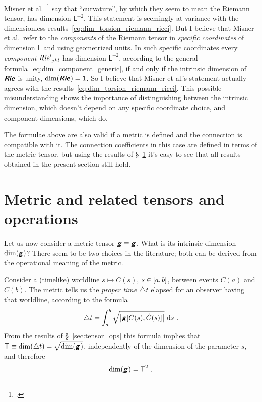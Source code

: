 \documentclass[\ifafour a4paper,12pt,\else a5paper,10pt,\fi%
onecolumn,oneside,article,%
british%
]{memoir}
\makeatletter
\theoremstyle{remark}
\theoremstyle{innote}
\newcommand*{\mathte}[1]{\textbf{\textit{\textsf{#1}}}}
\newcommand*{\citep}{\footcites}
\newcommand*{\di}{\mathrm{d}}%
\newcommand*{\incr}{\triangle}%
\DeclarePairedDelimiter\clcl{[}{]}
\DeclarePairedDelimiter\abs{\lvert}{\rvert}
\renewcommand*{\|}[1][]{\nonscript\,#1\vert\nonscript\;\mathopen{}}
\newcommand*{\sect}{\S}%
\newcommand*{\etal}{{et al.}}
\newcommand*{\q}{}%
\DeclareRobustCommand*{\q}{%
  \mathord{\mathpalette\bigcdot@{}}%
}
\newcommand*{\bigcdot@scalefactor}{0.7}
\newcommand*{\bigcdot@widthfactor}{1.5}
\newcommand*{\bigcdot@}[2]{%
  \sbox0{$#1\vcenter{}$}%
  \sbox2{$#1\cdot\m@th$}%
  \hbox to \bigcdot@widthfactor\wd2{%
    \hfil
    \raise\ht0\hbox{%
      \scalebox{\bigcdot@scalefactor}{%
        \lower\ht0\hbox{$#1\bullet\m@th$}%
      }%
    }%
    \hfil
  }%
}
\newcommand*{\Un}{\textsf{1}}
\newcommand*{\Le}{\textsf{L}}
\newcommand*{\Ti}{\textsf{T}}
\newcommand*{\yg}{\mathte{g}}
\newcommand*{\yR}{\mathte{Rie}}
\renewcommand*{\i}{\indices}
\newcommand*{\inct}{\incr t}
\makeatother
\begin{document}
Misner \etal\ \citep[p.~35%
]{misneretal1970_r1973} say that \enquote{curvature}, by which they seem to
mean the Riemann tensor, has dimension $\Le^{-2}$. This statement is
seemingly at variance with the dimensionless
results~\eqref{eq:dim_torsion_riemann_ricci}. But I believe that Misner
\etal\ refer to the \emph{components} of the Riemann tensor in
\emph{specific coordinates} of dimension $\Le$ and using geometrized units.
In such specific coordinates every \emph{component}
$\mathit{Rie}\i{^{i}_{jkl}}$ has dimension $\Le^{-2}$, according to the
general formula~\eqref{eq:dim_component_generic}, if and only if the
intrinsic dimension of $\yR$ is unity, $\dim(\yR)=\Un$. So I believe that
Misner \etal's statement actually agrees with the
results~\eqref{eq:dim_torsion_riemann_ricci}. This possible
misunderstanding shows the importance of distinguishing between the
intrinsic dimension, which doesn't depend on any specific coordinate
choice, and component dimensions, which do.

\medskip

The formulae above are also valid if a metric is defined and the connection
is compatible with it. The connection coefficients in this case are defined
in terms of the metric tensor, but using the results of
\sect~\ref{sec:metric} it's easy to see that all results obtained in the
present section still hold.


\section{Metric and related tensors and operations}
\label{sec:metric}

Let us now consider a metric tensor $\yg \equiv \yg\i{_{\q\q}}$. What is
its intrinsic dimension $\dim(\yg)$? There seem to be two choices in the
literature; both can be derived from the operational meaning of the metric.


Consider a (timelike) worldline $s \mapsto C(s)$, $s\in \clcl{a,b}$,
between events $C(a)$ and $C(b)$. The metric tells us the \emph{proper
  time} $\inct$ elapsed for an observer having that worldline, according to
the formula
\begin{equation}%
  \label{eq:proper_time}
\inct =  \int_a^b
\sqrt{\abs*{\yg[\dot{C}(s),\dot{C}(s)]}} \  \di s\ .
\end{equation}
From the results of \sect~\ref{sec:tensor_ops} this formula implies that
 $\Ti \equiv \dim(\inct) = \sqrt{\dim(\yg\i{_{\q\q}})}$,
 independently of the dimension of the parameter $s$, and therefore
\begin{equation}%
  \label{eq:dim_g}
  \dim(\yg\i{_{\q\q}}) = \Ti^{2}\ .
\end{equation}
\end{document}
